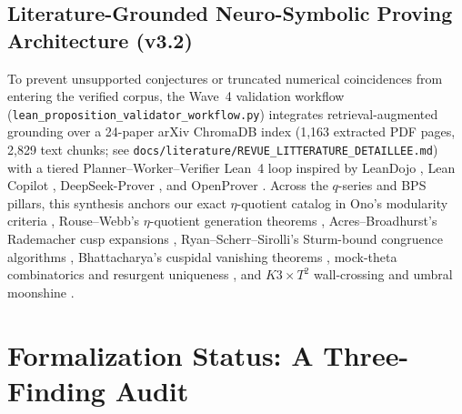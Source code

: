 \documentclass[11pt,a4paper]{article}
\theoremstyle{plain}
\theoremstyle{definition}
\theoremstyle{remark}
\begin{document}
\subsection{Literature-Grounded Neuro-Symbolic Proving Architecture (v3.2)}
To prevent unsupported conjectures or truncated numerical coincidences from entering the verified corpus, the Wave~4 validation workflow (\texttt{lean\_proposition\_validator\_workflow.py}) integrates retrieval-augmented grounding over a 24-paper arXiv ChromaDB index (1,163 extracted PDF pages, 2,829 text chunks; see \texttt{docs/literature/REVUE\_LITTERATURE\_DETAILLEE.md}) with a tiered Planner--Worker--Verifier Lean~4 loop inspired by LeanDojo \cite{Yang2023LeanDojo}, Lean Copilot \cite{Song2024LeanCopilot}, DeepSeek-Prover \cite{Xin2024DeepSeekProver}, and OpenProver \cite{Kripner2026OpenProver}. Across the $q$-series and BPS pillars, this synthesis anchors our exact $\eta$-quotient catalog in Ono's modularity criteria \cite{Ono2004}, Rouse--Webb's $\eta$-quotient generation theorems \cite{RouseWebb2015}, Acres--Broadhurst's Rademacher cusp expansions \cite{AcresBroadhurst2018}, Ryan--Scherr--Sirolli's Sturm-bound congruence algorithms \cite{RyanScherrSirolli2019}, Bhattacharya's cuspidal vanishing theorems \cite{Bhattacharya2026}, mock-theta combinatorics and resurgent uniqueness \cite{MalmendierOno2012, BallantineBursonFolsom2022, CostinDunneSaraeb2026}, and $K3\times T^2$ wall-crossing and umbral moonshine \cite{DMZ2012, CDH2014}.


\section{Formalization Status: A Three-Finding Audit}
\label{sec:lean}
\end{document}
